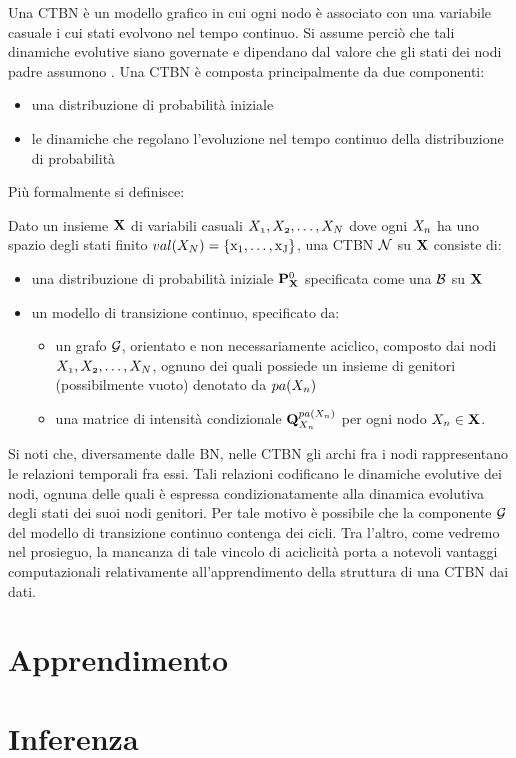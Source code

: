 Una \acl{CTBN} è un modello grafico in cui ogni nodo è associato con una variabile casuale i cui stati evolvono nel tempo continuo. Si assume perciò che tali dinamiche evolutive siano governate e dipendano dal valore che gli stati dei nodi padre assumono \cite{Stella2012}.
Una \acs{CTBN} è composta principalmente da due componenti:
\begin{itemize}
    \item una distribuzione di probabilità iniziale
    \item le dinamiche che regolano l'evoluzione nel tempo continuo della distribuzione di probabilità
\end{itemize}
Più formalmente si definisce:
\begin{definizione}
Dato un insieme $\mathbf{X}$ di variabili casuali $\mathnormal{X_1}, \mathnormal{X_2}, \dotsc, \mathnormal{X_N}$ dove ogni $\mathnormal{X_n}$ ha uno spazio degli stati finito $val(\mathnormal{X_N})=\{ \mathrm{x_1}, \dotsc, \mathrm{x_J} \}$, una \acs{CTBN} $\mathcal{N}$ su $\mathbf{X}$ consiste di:
\begin{itemize}
    \item una distribuzione di probabilità iniziale $\mathbf{P}^0_{\mathbf{X}}$ specificata come una \bn{} $\mathcal{B}$ su $\mathbf{X}$
    \item un modello di transizione continuo, specificato da:
    \begin{itemize}
        \item un grafo $\mathcal{G}$, orientato e non necessariamente aciclico, composto dai nodi $\mathnormal{X_1}, \mathnormal{X_2}, \dotsc, \mathnormal{X_N}$, ognuno dei quali possiede un insieme di genitori (possibilmente vuoto) denotato da $pa(\mathnormal{X_n})$
        \item una matrice di intensità condizionale $\mathbf{Q}^{pa(\mathnormal{X_n})}_{\mathnormal{X_n}}$ per ogni nodo $\mathnormal{X_n} \in \mathbf{X}$.
    \end{itemize}
\end{itemize}
\end{definizione}
\begin{nota}
Si noti che, diversamente dalle \acl{BN}, nelle \acl{CTBN} gli archi fra i nodi rappresentano le relazioni temporali fra essi. Tali relazioni codificano le dinamiche evolutive dei nodi, ognuna delle quali è espressa condizionatamente alla dinamica evolutiva degli stati dei suoi nodi genitori. Per tale motivo è possibile che la componente $\mathcal{G}$ del modello di transizione continuo contenga dei cicli. Tra l'altro, come vedremo nel prosieguo, la mancanza di tale vincolo di aciclicità porta a notevoli vantaggi computazionali relativamente all'apprendimento della struttura di una \acs{CTBN} dai dati. 
\end{nota}

\section{Apprendimento}
\label{sec:apprendimento}

\section{Inferenza}
\label{sec:inferenza}


